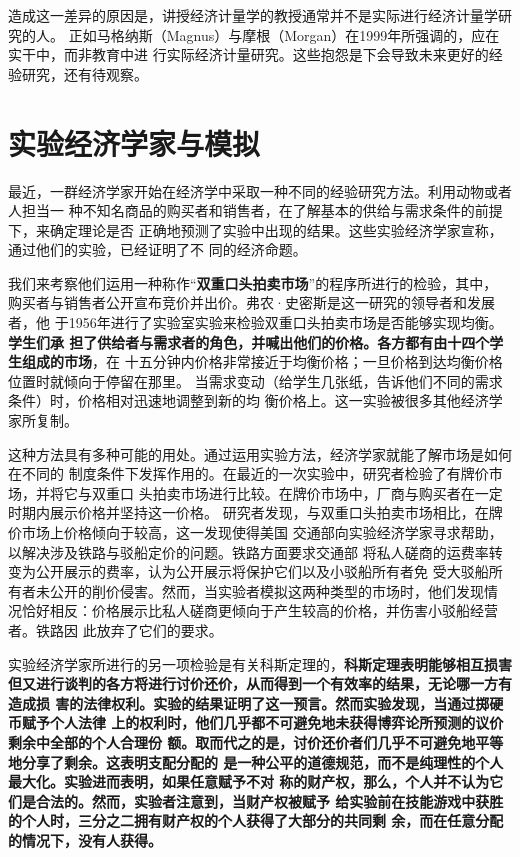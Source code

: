造成这一差异的原因是，讲授经济计量学的教授通常并不是实际进行经济计量学研究的人。
正如马格纳斯（Magnus）与摩根（Morgan）在1999年所强调的，应在实干中，而非教育中进
行实际经济计量研究。这些抱怨是下会导致未来更好的经验研究，还有待观察。

\section{实验经济学家与模拟}

最近，一群经济学家开始在经济学中采取一种不同的经验研究方法。利用动物或者人担当一
种不知名商品的购买者和销售者，在了解基本的供给与需求条件的前提下，来确定理论是否
正确地预测了实验中出现的结果。这些实验经济学家宣称，通过他们的实验，已经证明了不
同的经济命题。

我们来考察他们运用一种称作“\textbf{双重口头拍卖市场}”的程序所进行的检验，其中，
购买者与销售者公开宣布竞价并出价。弗农·史密斯是这一研究的领导者和发展者，他
于1956年进行了实验室实验来检验双重口头拍卖市场是否能够实现均衡。\textbf{学生们承
  担了供给者与需求者的角色，并喊出他们的价格。各方都有由十四个学生组成的市场}，在
十五分钟内价格非常接近于均衡价格；一旦价格到达均衡价格位置时就倾向于停留在那里。
当需求变动（给学生几张纸，告诉他们不同的需求条件）时，价格相对迅速地调整到新的均
衡价格上。这一实验被很多其他经济学家所复制。

这种方法具有多种可能的用处。通过运用实验方法，经济学家就能了解市场是如何在不同的
制度条件下发挥作用的。在最近的一次实验中，研究者检验了有牌价市场，并将它与双重口
头拍卖市场进行比较。在牌价市场中，厂商与购买者在一定时期内展示价格并坚持这一价格。
研究者发现，与双重口头拍卖市场相比，在牌价市场上价格倾向于较高，这一发现使得美国
交通部向实验经济学家寻求帮助，以解决涉及铁路与驳船定价的问题。铁路方面要求交通部
将私人磋商的运费率转变为公开展示的费率，认为公开展示将保护它们以及小驳船所有者免
受大驳船所有者未公开的削价侵害。然而，当实验者模拟这两种类型的市场时，他们发现情
况恰好相反：价格展示比私人磋商更倾向于产生较高的价格，并伤害小驳船经营者。铁路因
此放弃了它们的要求。

实验经济学家所进行的另一项检验是有关科斯定理的，\textbf{科斯定理表明能够相互损害
  但又进行谈判的各方将进行讨价还价，从而得到一个有效率的结果，无论哪一方有造成损
  害的法律权利。实验的结果证明了这一预言。然而实验发现，当通过掷硬币赋予个人法律
  上的权利时，他们几乎都不可避免地未获得博弈论所预测的议价剩余中全部的个人合理份
  额。取而代之的是，讨价还价者们几乎不可避免地平等地分享了剩余。这表明支配分配的
  是一种公平的道德规范，而不是纯理性的个人最大化。实验进而表明，如果任意赋予不对
  称的财产权，那么，个人并不认为它们是合法的。然而，实验者注意到，当财产权被赋予
  给实验前在技能游戏中获胜的个人时，三分之二拥有财产权的个人获得了大部分的共同剩
  余，而在任意分配的情况下，没有人获得。}


